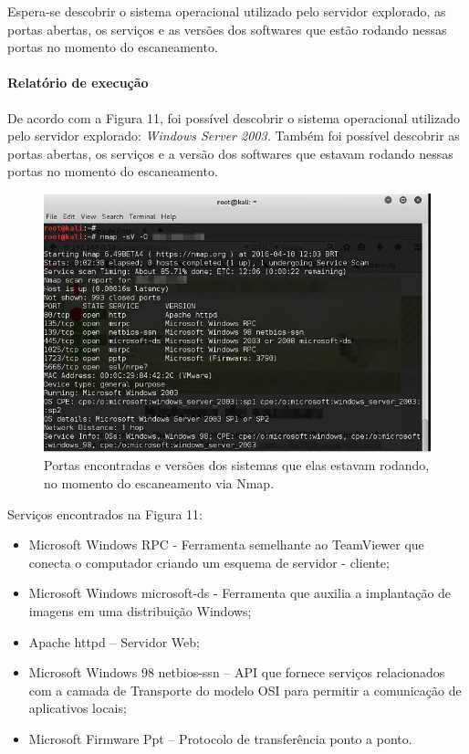 \documentclass[
    12pt,               %
    openright,          %
    oneside,            %
    a4paper,            %
    section=TITLE,     %
    english,            %
    french,             %
    spanish,            %
    brazil              %
    ]{abntex2}
\begin{document}
Espera-se descobrir o sistema operacional utilizado pelo servidor explorado, as portas abertas, os serviços e as versões dos softwares que estão rodando nessas portas no momento do escaneamento.



\paragraph*{Relatório de execução}

De acordo com a Figura 11, foi possível descobrir o sistema operacional utilizado pelo servidor explorado: \emph{Windows Server 2003.} Também foi possível descobrir as portas abertas, os serviços e a versão dos softwares que estavam rodando nessas portas no momento do escaneamento.





\begin{figure}[htp]
\centering
\caption{Portas encontradas e versões dos sistemas que elas estavam rodando, no momento do escaneamento via Nmap.}
\includegraphics[width=450px]{image5.jpeg}
\end{figure}
\ifdefined\FloatBarrier \FloatBarrier \fi


Serviços encontrados na Figura 11:



\begin{itemize}
	
\item Microsoft Windows RPC - Ferramenta semelhante ao TeamViewer que conecta o computador criando um esquema de servidor - cliente;
	
\item Microsoft Windows microsoft-ds - Ferramenta que auxilia a implantação de imagens em uma distribuição Windows;
	
\item Apache httpd -- Servidor Web;
	
\item Microsoft Windows 98 netbios-ssn -- API que fornece serviços relacionados com a camada de Transporte do modelo OSI para permitir a comunicação de aplicativos locais;
	
\item Microsoft Firmware Ppt -- Protocolo de transferência ponto a ponto.

\end{itemize}
\end{document}
